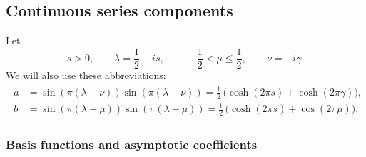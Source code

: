 \documentclass[11pt]{article}
\begin{document}
\subsection{Continuous series components } \label{app:cont}

Let
\begin{equation}
s>0,\qquad \lambda=\frac{1}{2}+is,\qquad -\frac{1}{2}<\mu\leq\frac{1}{2},\qquad
\nu=-i\gamma.
\end{equation}
We will also use these abbreviations:
\begin{gather}
\begin{aligned}
a&=\sin(\pi(\lambda+\nu))\sin(\pi(\lambda-\nu))
=\frac{1}{2}\,\bigl(\cosh(2\pi s)+\cosh(2\pi\gamma)\bigr),\\[3pt]
b&=\sin(\pi(\lambda+\mu))\sin(\pi(\lambda-\mu))
=\frac{1}{2}\,\bigl(\cosh(2\pi s)+\cos(2\pi\mu)\bigr).
\end{aligned}
\end{gather}

\subsubsection{Basis functions and asymptotic coefficients }
\end{document}
